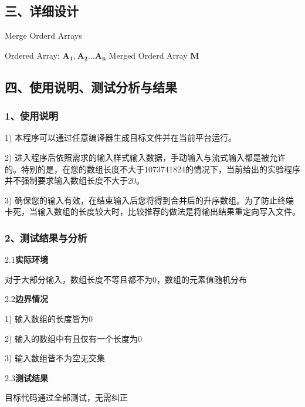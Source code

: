 \documentclass[UTF8, a4paper]{ctexart}
\begin{document}
\subsection*{三、详细设计}
\begin{algorithm}[H]
\caption{Merge Orderd Arrays}
\label{alg:Framwork}
\begin{algorithmic}[1]
\Require Ordered Array: $\mathbf{A_1},\mathbf{A_2}...\mathbf{A_n}$
\Ensure Merged Orderd Array $\mathbf{M}$
	\EndIf
\EndWhile
\State{}
\end{algorithmic}
\end{algorithm}

\subsection*{四、使用说明、测试分析与结果}
\subsubsection*{1、使用说明}
1) 本程序可以通过任意编译器生成目标文件并在当前平台运行。 \par
2) 进入程序后依照需求的输入样式输入数据，手动输入与流式输入都是被允许的。特别的是，在您的数组长度不大于1073741824的情况下，当前给出的实验程序并不强制要求输入数组长度不大于20。 \par
3) 确保您的输入有效，在结束输入后您将得到合并后的升序数组。为了防止终端卡死，当输入数组的长度较大时，比较推荐的做法是将输出结果重定向写入文件。
\subsubsection*{2、测试结果与分析}
2.1\;\textbf{实际环境} \par
对于大部分输入，数组长度不等且都不为0，数组的元素值随机分布 \par
2.2\;\textbf{边界情况} \par
1) 输入数组的长度皆为0 \par
2) 输入的数组中有且仅有一个长度为0 \par
3) 输入数组皆不为空无交集 \par
2.3\;\textbf{测试结果} \par
目标代码通过全部测试，无需纠正
\end{document}
